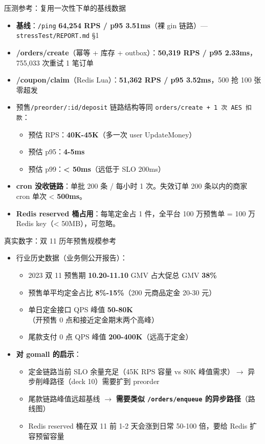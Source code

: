 \documentclass[aspectratio=169,11pt]{beamer}
\begin{document}
\begin{frame}[shrink]{压测参考：复用一次性下单的基线数据}
\begin{itemize}\small
  \item \textbf{基线}：\texttt{/ping} \textbf{64,254 RPS / p95 3.51ms}（裸 gin 链路）— \texttt{stressTest/REPORT.md} §1
  \item \textbf{/orders/create}（幂等 + 库存 + outbox）：\textbf{50,319 RPS / p95 2.33ms}，755,033 次重试 1 笔订单
  \item \textbf{/coupon/claim}（Redis Lua）：\textbf{51,362 RPS / p95 3.52ms}，500 抢 100 张零超发
  \item 预售\texttt{/preorder/:id/deposit} 链路结构等同 \texttt{orders/create + 1 次 AES 扣款}：
    \begin{itemize}\footnotesize
      \item 预估 RPS：\textbf{40K-45K}（多一次 user UpdateMoney）
      \item 预估 p95：\textbf{4-5ms}
      \item 预估 p99：\textbf{< 50ms}（远低于 SLO 200ms）
    \end{itemize}
  \item \textbf{cron 没收链路}：单批 200 条 / 每小时 1 次。失效订单 200 条以内的商家 cron 单次 < \textbf{500ms}。
  \item \textbf{Redis reserved 桶占用}：每笔定金占 1 件，全平台 100 万预售单 = 100 万 Redis key（< 50MB），可忽略。
\end{itemize}
\end{frame}

\begin{frame}[shrink]{真实数字：双 11 历年预售规模参考}
\begin{itemize}\small
  \item 行业历史数据（业务侧公开报告）：
    \begin{itemize}\footnotesize
      \item 2023 双 11 预售期 \textbf{10.20-11.10} GMV 占大促总 GMV \textbf{38\%}
      \item 预售单平均定金占比 \textbf{8\%-15\%}（200 元商品定金 20-30 元）
      \item 单日定金接口 QPS 峰值 \textbf{50-80K}（开预售 0 点和接近定金期末两个高峰）
      \item 尾款支付 0 点 QPS 峰值 \textbf{200-400K}（远高于定金）
    \end{itemize}
  \item \textbf{对 gomall 的启示}：
    \begin{itemize}\footnotesize
      \item 定金链路当前 SLO 余量充足（45K RPS 容量 vs 80K 峰值需求）$\to$ 异步削峰路径（deck 10）需要扩到 preorder
      \item 尾款链路峰值远超基线 $\to$ \textbf{需要类似 \texttt{/orders/enqueue} 的异步路径}（路线图）
      \item Redis reserved 桶在双 11 前 1-2 天会涨到日常 50-100 倍，要给 Redis 扩容预留容量
    \end{itemize}
\end{itemize}
\end{frame}
\end{document}
